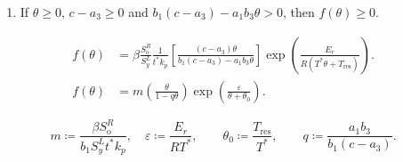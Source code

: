 \documentclass[
    8pt,
    aspectratio=1610,
    c,
    intlimits,
    leqno,
    professionalfonts,
]{beamer}
\begin{document}
\begin{frame}
\begin{enumerate}
		      \

		\item

		      If $\theta\geq 0$, $c-a_{3}\geq 0$ and
		      $b_{1}\left(c-a_{3}\right)-a_{1}b_{3}\theta>0$,
		      then $f\left(\theta\right)\geq 0$.
	\end{enumerate}
\end{frame}

\begin{frame}
	\begin{align*}
		f\left(\theta\right) & =
		\beta
		\frac{S^{R}_{\text{o}}}{S^{L}_{y}}
		\frac{1}{t^{\ast}k_{p}}
		\left[
			\frac{
				\left(c-a_{3}\right)\theta}{
				b_{1}
				\left(c-a_{3}\right)-
				a_{1}
				b_{3}
				\theta
			}
			\right]
		\exp
		\left(
		\frac{E_{r}}{
			R\left(T^{\ast}\theta+T_{\text{res}}\right)
		}
		\right).                 \\
		f\left(\theta\right) & =
		m\left(\frac{\theta}{1-q\theta}\right)
		\exp\left(\frac{\varepsilon}{\theta+\theta_{0}}\right).
	\end{align*}

	\begin{equation*}
		m\coloneqq
		\frac{\beta S^{R}_{\text{o}}}{b_{1}S^{L}_{y}t^{\ast}k_{p}},\quad
		\varepsilon\coloneqq \frac{E_{r}}{RT^{\ast}},\qquad
		\theta_{0}\coloneqq \frac{T_{\text{res}}}{T^{\ast}},\qquad
		q\coloneqq \frac{a_{1}b_{3}}{b_{1}\left(c-a_{3}\right)}.
	\end{equation*}
\end{frame}
\end{document}
